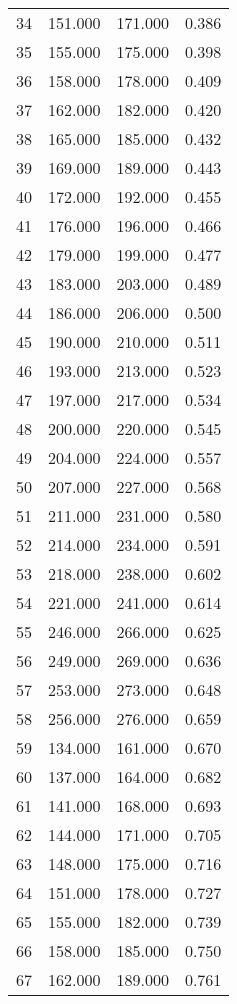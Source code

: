 \begin{tabular}{cccc}
  34 & 151.000 & 171.000 & 0.386 \\ 
  35 & 155.000 & 175.000 & 0.398 \\ 
  36 & 158.000 & 178.000 & 0.409 \\ 
  37 & 162.000 & 182.000 & 0.420 \\ 
  38 & 165.000 & 185.000 & 0.432 \\ 
  39 & 169.000 & 189.000 & 0.443 \\ 
  40 & 172.000 & 192.000 & 0.455 \\ 
  41 & 176.000 & 196.000 & 0.466 \\ 
  42 & 179.000 & 199.000 & 0.477 \\ 
  43 & 183.000 & 203.000 & 0.489 \\ 
  44 & 186.000 & 206.000 & 0.500 \\ 
  45 & 190.000 & 210.000 & 0.511 \\ 
  46 & 193.000 & 213.000 & 0.523 \\ 
  47 & 197.000 & 217.000 & 0.534 \\ 
  48 & 200.000 & 220.000 & 0.545 \\ 
  49 & 204.000 & 224.000 & 0.557 \\ 
  50 & 207.000 & 227.000 & 0.568 \\ 
  51 & 211.000 & 231.000 & 0.580 \\ 
  52 & 214.000 & 234.000 & 0.591 \\ 
  53 & 218.000 & 238.000 & 0.602 \\ 
  54 & 221.000 & 241.000 & 0.614 \\ 
  55 & 246.000 & 266.000 & 0.625 \\ 
  56 & 249.000 & 269.000 & 0.636 \\ 
  57 & 253.000 & 273.000 & 0.648 \\ 
  58 & 256.000 & 276.000 & 0.659 \\ 
  59 & 134.000 & 161.000 & 0.670 \\ 
  60 & 137.000 & 164.000 & 0.682 \\ 
  61 & 141.000 & 168.000 & 0.693 \\ 
  62 & 144.000 & 171.000 & 0.705 \\ 
  63 & 148.000 & 175.000 & 0.716 \\ 
  64 & 151.000 & 178.000 & 0.727 \\ 
  65 & 155.000 & 182.000 & 0.739 \\ 
  66 & 158.000 & 185.000 & 0.750 \\ 
  67 & 162.000 & 189.000 & 0.761 \\ 

\end{tabular}
